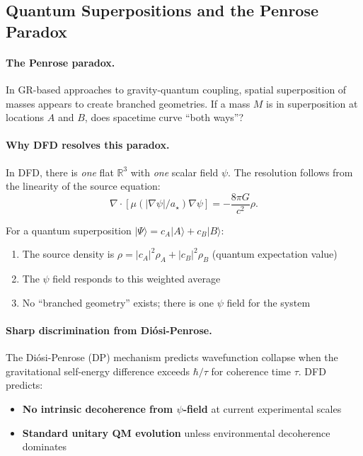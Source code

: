 \subsection{Quantum Superpositions and the Penrose Paradox}\label{sec:open-penrose}

\paragraph{The Penrose paradox.}
In GR-based approaches to gravity-quantum coupling, spatial superposition of masses appears to create branched geometries. If a mass $M$ is in superposition at locations $A$ and $B$, does spacetime curve ``both ways''?

\paragraph{Why DFD resolves this paradox.}
In DFD, there is \textit{one} flat $\mathbb{R}^3$ with \textit{one} scalar field $\psi$. The resolution follows from the linearity of the source equation:
\begin{equation}
\nabla \cdot [\mu(|\nabla\psi|/a_\star)\nabla\psi] = -\frac{8\pi G}{c^2}\rho.
\end{equation}

For a quantum superposition $|\Psi\rangle = c_A|A\rangle + c_B|B\rangle$:
\begin{enumerate}
\item The source density is $\rho = |c_A|^2 \rho_A + |c_B|^2 \rho_B$ (quantum expectation value)
\item The $\psi$ field responds to this weighted average
\item No ``branched geometry'' exists; there is one $\psi$ field for the system
\end{enumerate}

\paragraph{Sharp discrimination from Diósi-Penrose.}
The Diósi-Penrose (DP) mechanism predicts wavefunction collapse when the gravitational self-energy difference exceeds $\hbar/\tau$ for coherence time $\tau$. DFD predicts:
\begin{itemize}
\item \textbf{No intrinsic decoherence from $\psi$-field} at current experimental scales
\item \textbf{Standard unitary QM evolution} unless environmental decoherence dominates
\end{itemize}

